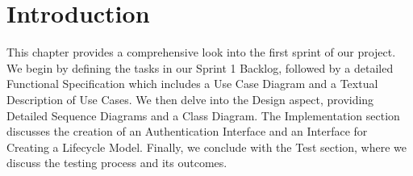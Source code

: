 \section*{Introduction}

This chapter provides a comprehensive look into the first sprint of our project. We begin by defining the tasks in our Sprint 1 Backlog, followed by a detailed Functional Specification which includes a Use Case Diagram and a Textual Description of Use Cases. We then delve into the Design aspect, providing Detailed Sequence Diagrams and a Class Diagram. The Implementation section discusses the creation of an Authentication Interface and an Interface for Creating a Lifecycle Model. Finally, we conclude with the Test section, where we discuss the testing process and its outcomes.